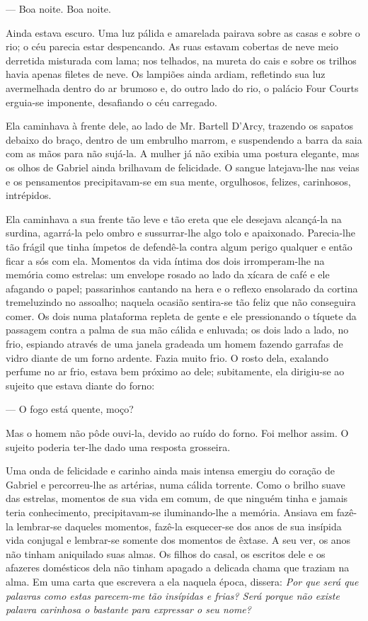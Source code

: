 --- Boa noite. Boa noite.

Ainda estava escuro. Uma luz pálida e amarelada pairava sobre as casas
e sobre o rio; o céu parecia estar despencando. As ruas estavam
cobertas de neve meio derretida misturada com lama; nos telhados, na
mureta do cais e sobre os trilhos havia apenas filetes de neve. Os
lampiões ainda ardiam, refletindo sua
luz avermelhada dentro do ar brumoso e, do outro lado do rio, o
palácio Four Courts erguia-se imponente, desafiando o céu carregado.

Ela caminhava à frente dele, ao lado de Mr. Bartell D'Arcy, trazendo
os sapatos debaixo do braço, dentro de um embrulho marrom, e
suspendendo a barra da saia com as mãos para não sujá-la. A mulher já
não exibia uma postura elegante, mas os olhos de Gabriel ainda
brilhavam de felicidade. O sangue latejava-lhe nas veias e os
pensamentos precipitavam-se em sua mente, orgulhosos, felizes,
carinhosos, intrépidos.

Ela caminhava a sua frente tão leve e tão ereta que ele desejava
alcançá-la na surdina, agarrá-la pelo ombro e sussurrar-lhe algo tolo
e apaixonado. Parecia-lhe tão frágil que tinha ímpetos de defendê-la
contra algum perigo qualquer e então ficar a sós com ela. Momentos da
vida íntima dos dois irromperam-lhe na memória como estrelas: um
envelope rosado ao lado da xícara de café e ele afagando o papel;
passarinhos cantando na hera e o reflexo ensolarado da cortina
tremeluzindo no assoalho; naquela ocasião sentira-se tão feliz que não
conseguira comer. Os dois numa plataforma repleta de gente e ele
pressionando o tíquete da passagem contra a palma de sua mão cálida
e enluvada; os dois lado a lado, no frio, espiando através de uma
janela gradeada um homem fazendo garrafas de vidro diante de um forno
ardente. Fazia muito frio. O rosto dela, exalando perfume no ar frio,
estava bem próximo ao dele; subitamente, ela dirigiu-se ao sujeito que
estava diante do forno:

--- O fogo está quente, moço?

Mas o homem não pôde ouvi-la, devido ao ruído do forno. Foi melhor
assim. O sujeito poderia ter-lhe dado uma resposta grosseira.

Uma onda de felicidade e carinho ainda mais intensa emergiu do coração
de Gabriel e percorreu-lhe as artérias, numa cálida torrente. Como o
brilho suave das estrelas, momentos de sua vida em comum, de que
ninguém tinha e jamais teria conhecimento, precipitavam-se
iluminando-lhe a memória. Ansiava em fazê-la lembrar-se daqueles
momentos, fazê-la esquecer-se dos anos de sua insípida vida conjugal e
lembrar-se somente dos momentos
de êxtase. A seu ver, os anos não tinham aniquilado suas almas. Os
filhos do casal, os escritos dele e os afazeres domésticos dela não
tinham apagado a delicada chama que traziam na alma. Em uma carta que
escrevera a ela naquela época, dissera: \textit{Por que será que palavras como
estas parecem-me tão insípidas e frias? Será porque não existe palavra
carinhosa o bastante para expressar o seu nome?}

